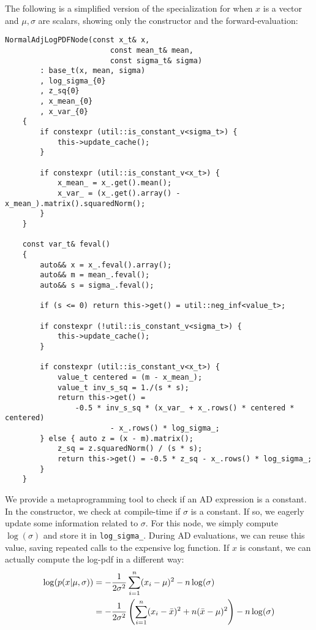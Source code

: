 The following is a simplified version of the specialization 
for when $x$ is a vector and $\mu, \sigma$ are scalars, 
showing only the constructor and the forward-evaluation:
\begin{lstlisting}[style=customcpp]
    NormalAdjLogPDFNode(const x_t& x,
                        const mean_t& mean,
                        const sigma_t& sigma)
        : base_t(x, mean, sigma)
        , log_sigma_{0}
        , z_sq{0}
        , x_mean_{0}
        , x_var_{0}
    {
        if constexpr (util::is_constant_v<sigma_t>) {
            this->update_cache();
        }

        if constexpr (util::is_constant_v<x_t>) {
            x_mean_ = x_.get().mean();
            x_var_ = (x_.get().array() - x_mean_).matrix().squaredNorm();
        }
    }

    const var_t& feval()
    {
        auto&& x = x_.feval().array();
        auto&& m = mean_.feval();
        auto&& s = sigma_.feval();

        if (s <= 0) return this->get() = util::neg_inf<value_t>;

        if constexpr (!util::is_constant_v<sigma_t>) {
            this->update_cache();
        }

        if constexpr (util::is_constant_v<x_t>) {
            value_t centered = (m - x_mean_);
            value_t inv_s_sq = 1./(s * s);
            return this->get() = 
                -0.5 * inv_s_sq * (x_var_ + x_.rows() * centered * centered) 
                        - x_.rows() * log_sigma_;
        } else { auto z = (x - m).matrix();
            z_sq = z.squaredNorm() / (s * s);
            return this->get() = -0.5 * z_sq - x_.rows() * log_sigma_; 
        }
    }
\end{lstlisting}
We provide a metaprogramming tool to check if an AD expression is a constant.
In the constructor, we check at compile-time if $\sigma$ is a constant.
If so, we eagerly update some information related to $\sigma$.
For this node, we simply compute $\log(\sigma)$ and store it in \verb|log_sigma_|.
During AD evaluations, we can reuse this value, saving repeated calls to the expensive log function.
If $x$ is constant, we can actually compute the log-pdf in a different way:
\begin{align}
    \log(p(x|\mu, \sigma)) 
    &= -\frac{1}{2 \sigma^2} 
        \sum\limits_{i=1}^n (x_i - \mu)^2 
        - n\log(\sigma) \label{eq:normal_log_pdf} \\
    &= -\frac{1}{2 \sigma^2} 
        \left(\sum\limits_{i=1}^n (x_i - \bar{x})^2 + n(\bar{x} - \mu)^2\right) 
        - n\log(\sigma) \label{eq:normal_log_pdf_x_const}
\end{align}
